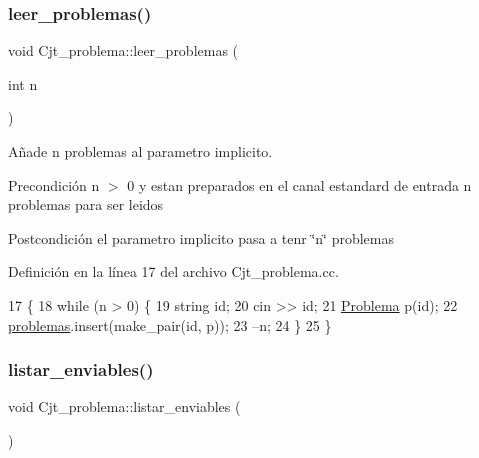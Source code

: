 \subsubsection{\texorpdfstring{leer\+\_\+problemas()}{leer\_problemas()}}
{\footnotesize\ttfamily void Cjt\+\_\+problema\+::leer\+\_\+problemas (\begin{DoxyParamCaption}\item[{int}]{n }\end{DoxyParamCaption})}



Añade n problemas al parametro implicito. 

\begin{DoxyPrecond}{Precondición}
n $>$ 0 y estan preparados en el canal estandard de entrada n problemas para ser leidos 
\end{DoxyPrecond}
\begin{DoxyPostcond}{Postcondición}
el parametro implicito pasa a tenr \char`\"{}n\char`\"{} problemas 
\end{DoxyPostcond}


Definición en la línea 17 del archivo Cjt\+\_\+problema.\+cc.


\begin{DoxyCode}
17                                        \{
18     \textcolor{keywordflow}{while} (n > 0) \{
19         \textcolor{keywordtype}{string} id;
20         cin >> id;
21         \mbox{\hyperlink{class_problema}{Problema}} p(\textcolor{keywordtype}{id});
22         \mbox{\hyperlink{class_cjt__problema_a2d471986320805c5b27f8d14d486fca8}{problemas}}.insert(make\_pair(\textcolor{keywordtype}{id}, p));
23         --n;
24     \}
25 \}
\end{DoxyCode}
\mbox{\label{class_cjt__problema_a9f5508bb9d73918c4c99c6218315f168}} 
\subsubsection{\texorpdfstring{listar\+\_\+enviables()}{listar\_enviables()}}
{\footnotesize\ttfamily void Cjt\+\_\+problema\+::listar\+\_\+enviables (\begin{DoxyParamCaption}{ }\end{DoxyParamCaption})}



